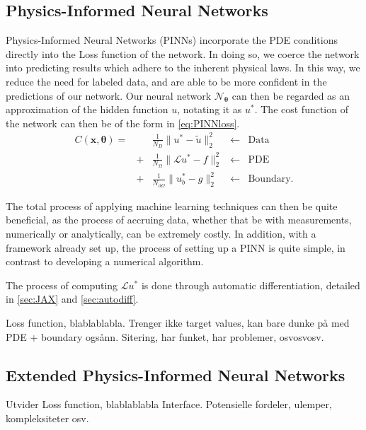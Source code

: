 \subsection{Physics-Informed Neural Networks}
Physics-Informed Neural Networks (PINNs) incorporate the PDE conditions directly into the Loss function of the network. In doing so, we coerce the network into predicting results which adhere to the inherent physical laws. In this way, we reduce the need for labeled data, and are able to be more confident in the predictions of our network. Our neural network $\mathcal{N}_{\boldsymbol{\theta}}$ can then be regarded as an approximation of the hidden function $u$, notating it as $u^*$. The cost function of the network can then be of the form in \autoref{eq:PINNloss}.
\begin{equation}\label{eq:PINNloss}
\begin{array}{rrrrr}
    C(\boldsymbol{x}, \boldsymbol{\theta}) =& & \frac{1}{N_{D}}\lVert u^* - \tilde{u} \rVert_2^2 &\leftarrow& \text{Data} \\
    &+& \frac{1}{N_{\Omega}}\lVert \mathcal{L}u^* - f \rVert_2^2 &\leftarrow& \text{PDE} \\
    &+& \frac{1}{N_{\partial \Omega}} \lVert u^*_{b} - g \rVert_2^2 &\leftarrow& \text{Boundary}.
\end{array}
\end{equation}

The total process of applying machine learning techniques can then be quite beneficial, as the process of accruing data, whether that be with measurements, numerically or analytically, can be extremely costly. In addition, with a framework already set up, the process of setting up a PINN is quite simple, in contrast to developing a numerical algorithm.

The process of computing $\mathcal{L}u^*$ is done through automatic differentiation, detailed in \autoref{sec:JAX} and \autoref{sec:autodiff}.

Loss function, blablablabla. Trenger ikke target values, kan bare dunke på med PDE + boundary ogsånn. Sitering, har funket, har problemer, osvosvosv.

\subsection{Extended Physics-Informed Neural Networks}
Utvider Loss function, blablablabla Interface. Potensielle fordeler, ulemper, kompleksiteter osv.
